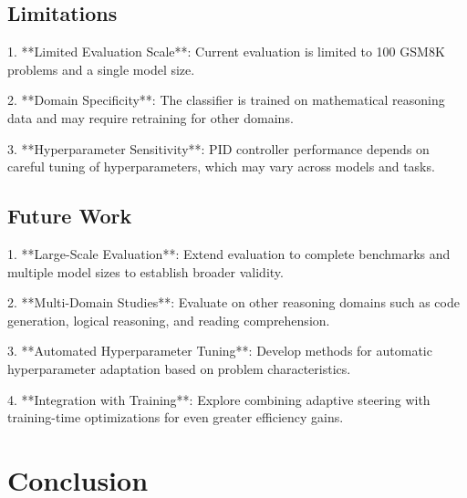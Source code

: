 \documentclass{article}
\begin{document}
\subsection{Limitations}

1. **Limited Evaluation Scale**: Current evaluation is limited to 100 GSM8K problems and a single model size.

2. **Domain Specificity**: The classifier is trained on mathematical reasoning data and may require retraining for other domains.

3. **Hyperparameter Sensitivity**: PID controller performance depends on careful tuning of hyperparameters, which may vary across models and tasks.

\subsection{Future Work}

1. **Large-Scale Evaluation**: Extend evaluation to complete benchmarks and multiple model sizes to establish broader validity.

2. **Multi-Domain Studies**: Evaluate on other reasoning domains such as code generation, logical reasoning, and reading comprehension.

3. **Automated Hyperparameter Tuning**: Develop methods for automatic hyperparameter adaptation based on problem characteristics.

4. **Integration with Training**: Explore combining adaptive steering with training-time optimizations for even greater efficiency gains.

\section{Conclusion}
\end{document}
